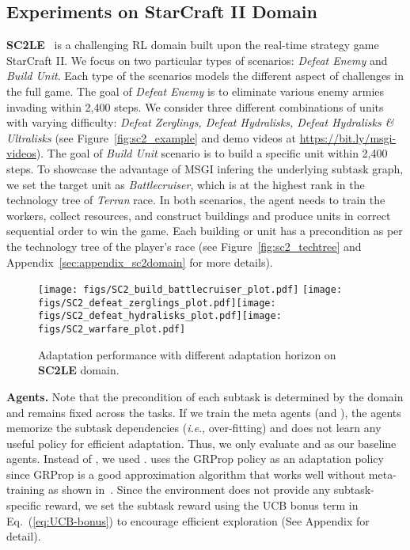 \documentclass{article} \usepackage{iclr2020_conference,times}
\makeatletter
\newcommand{\tb}{\textbf}
\DeclareRobustCommand\onedot{\futurelet\@let@token\@onedot}
\def\onedot{.}
\def\ie{\emph{i.e}\onedot} \def\Ie{\emph{I.e}\onedot}
\makeatother
\begin{document}
\subsection{Experiments on StarCraft II Domain}
\label{sec:experiments_sc2}
\tb{SC2LE}~\citep{vinyals2017starcraft} is a challenging RL domain
built upon the real-time strategy game StarCraft II.
We focus on two particular types of scenarios: \textit{Defeat Enemy} and \textit{Build Unit}. Each type of the scenarios models the different aspect of challenges in the full game. The goal of \textit{Defeat Enemy} is to eliminate various enemy armies invading within 2,400 steps. We consider three different combinations of units with varying difficulty: \textit{Defeat Zerglings, Defeat Hydralisks, Defeat Hydralisks \& Ultralisks} (see Figure~\ref{fig:sc2_example} and demo videos at {\small\url{https://bit.ly/msgi-videos}}). The goal of \textit{Build Unit} scenario is to build a specific unit within 2,400 steps.
To showcase the advantage of MSGI infering the underlying subtask graph, we set the target unit as \textit{Battlecruiser}, which is at the highest rank in the technology tree of \textit{Terran} race.
In both scenarios, the agent needs to train the workers, collect resources,
and construct buildings and produce units in correct sequential order to win the game.
Each building or unit has a precondition as per the technology tree of the player's race
(see Figure~\ref{fig:sc2_techtree} and Appendix~\ref{sec:appendix_sc2domain} for more details).
\begin{figure}[!t]
    \centering
    \texttt{[image: figs/SC2\_build\_battlecruiser\_plot.pdf]}
    \texttt{[image: figs/SC2\_defeat\_zerglings\_plot.pdf]}\texttt{[image: figs/SC2\_defeat\_hydralisks\_plot.pdf]}\texttt{[image: figs/SC2\_warfare\_plot.pdf]}\vspace*{-5pt}
    \caption{
        Adaptation performance with different adaptation horizon on \textbf{SC2LE} domain.
    }
    \label{fig:sc2_result}
\end{figure}

\textbf{Agents.}
Note that the precondition of each subtask is determined by the domain and remains fixed across the tasks.
If we train the meta agents (\NSGIMeta and \RLSquare), the agents memorize the subtask dependencies (\ie, over-fitting) and does not learn any useful policy for efficient adaptation.
Thus, we only evaluate \Random and \HRL as our baseline agents. Instead of \NSGIMeta, we used \NSGIGRProp. \NSGIGRProp uses the GRProp policy as an adaptation policy since GRProp is a good approximation algorithm that works well without meta-training as shown in~\citep{sohn2018hierarchical}. Since the environment does not provide any subtask-specific reward, we set the subtask reward using the UCB bonus term in Eq.~(\ref{eq:UCB-bonus}) to encourage efficient exploration (See Appendix for detail).
\end{document}
